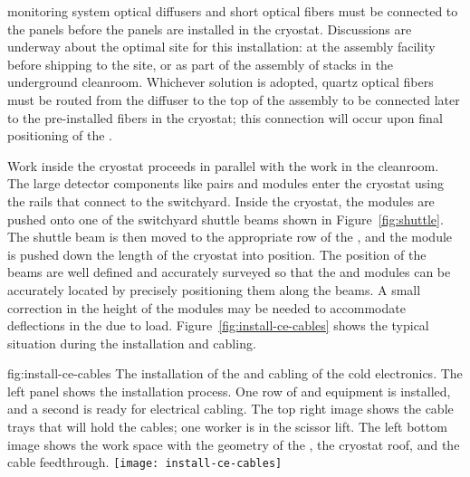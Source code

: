  monitoring system optical diffusers and short optical fibers must be connected to the  panels before the panels are installed in the cryostat.  Discussions are underway about the optimal site for this installation:  at the  assembly facility before shipping to the site, or as part of the assembly of  stacks in the underground cleanroom.  Whichever solution is adopted, quartz optical fibers must be routed from the diffuser to the top of the  assembly to be connected later to the pre-installed fibers in the cryostat; this connection will occur upon final positioning of the .  

Work inside the cryostat proceeds in parallel with the work in the %
cleanroom. 
The large detector components like  pairs and  modules enter the cryostat using the  rails that connect to the  switchyard. 
Inside the cryostat, the modules are pushed onto one of the switchyard shuttle beams shown in  Figure~\ref{fig:shuttle}. 
The  shuttle beam is then moved to the appropriate row of the , and  the module is pushed down the length of the cryostat into position. The position of the  beams are well defined and accurately surveyed so that the  and  modules can be accurately located by precisely positioning them along the  beams. A small correction in the height of the modules may be needed to accommodate deflections in the  due to load. Figure~\ref{fig:install-ce-cables} shows the typical situation during the  installation and  cabling. 

\begin{dunefigure}{fig:install-ce-cables}
  {The installation of the   and cabling of the cold electronics. %
  The left panel shows the   installation process. One row of   and  equipment is installed, and a second   is ready for electrical cabling. The top right image shows the cable trays that will hold the   cables; one worker is in the scissor lift. The left bottom image shows the work space with the geometry of the , the cryostat roof, and the cable feedthrough.}
\texttt{[image: install-ce-cables]}
\end{dunefigure}

